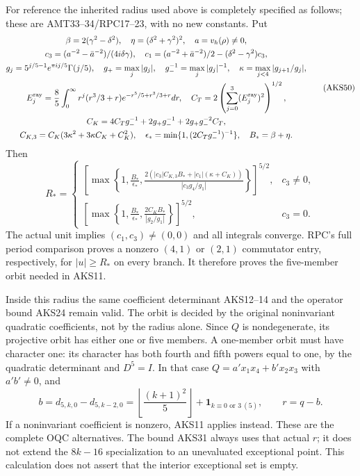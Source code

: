 \documentclass[11pt,a4paper]{article}
\begin{document}
For reference the inherited radius used above is completely specified
as follows; these are AMT33--34/RPC17--23, with no new constants. Put
\[
\begin{gathered}
 \beta=2(\gamma^2-\delta^2),\quad\eta=(\delta^2+\gamma^2)^2,\quad
 a=v_h(\rho)\ne0,\\
 c_3=(a^{-2}-\bar a^{-2})/(4i\delta\gamma),\quad
 c_1=(a^{-2}+\bar a^{-2})/2-(\delta^2-\gamma^2)c_3,\\
 g_j=5^{j/5-1}e^{\pi ij/5}\Gamma(j/5),\quad
 g_+=\max_j|g_j|,\quad g_-^{-1}=\max_j|g_j|^{-1},\quad
 \kappa=\max_{j<4}|g_{j+1}/g_j|,\\
 E_j^{\rm ray}=\frac85\int_0^\infty r^j(r^3/3+r)
       e^{-r^5/5+r^3/3+r}dr,\quad
 C_T=2\left(\sum_{j=0}^3(E_j^{\rm ray})^2\right)^{1/2},\\
 C_K=4C_Tg_-^{-1}+2g_+g_-^{-1}+2g_+g_-^{-2}C_T,\\
 C_{K,3}=C_K(3\kappa^2+3\kappa C_K+C_K^2),\quad
 \epsilon_* =\min\{1,(2C_Tg_-^{-1})^{-1}\},\quad B_* =\beta+\eta.
\end{gathered}\tag{AKS50}
\]
Then
\[
R_*=
\begin{cases}
\displaystyle\left[\max\left\{1,\frac{B_*}{\epsilon_*},
\frac{2(|c_3|C_{K,3}B_*+|c_1|(\kappa+C_K))}{|c_3g_4/g_1|}
\right\}\right]^{5/2},&c_3\ne0,\\[4pt]
\displaystyle\left[\max\left\{1,\frac{B_*}{\epsilon_*},
\frac{2C_KB_*}{|g_2/g_1|}\right\}\right]^{5/2},&c_3=0.
\end{cases}\tag{AKS51}
\]
The actual unit implies $(c_1,c_3)\ne(0,0)$ and all integrals converge.
RPC's full period comparison proves a nonzero $(4,1)$ or $(2,1)$
commutator entry, respectively, for $|u|\ge R_*$ on every branch. It
therefore proves the five-member orbit needed in AKS11.

Inside this radius the same coefficient determinant AKS12--14 and the
operator bound AKS24 remain valid. The orbit is decided by the original
noninvariant quadratic coefficients, not by the radius alone. Since
$Q$ is nondegenerate, its projective orbit has either one or five
members. A one-member orbit must have character one: its character has
both fourth and fifth powers equal to one, by the quadratic determinant
and $D^5=I$. In that case $Q=a'x_1x_4+b'x_2x_3$ with $a'b'\ne0$, and
\[
 b=d_{5,k,0}-d_{5,k-2,0}
   =\left\lfloor\frac{(k+1)^2}{5}\right\rfloor
           +\mathbf1_{k\equiv0\text{ or }3\ (5)},\qquad r=q-b.
 \tag{AKS52}
\]
If a noninvariant coefficient is nonzero, AKS11 applies instead. These
are the complete OQC alternatives. The bound AKS31 always uses that
actual $r$; it does not extend the $8k-16$ specialization to an
unevaluated exceptional point. This calculation does not assert that
the interior exceptional set is empty.
\end{document}
